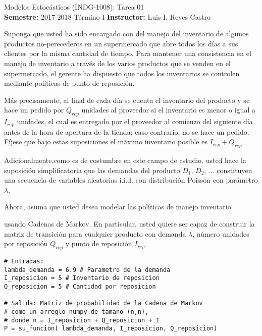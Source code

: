 \documentclass[ a4paper, twoside, 11pt]{article}
\newcommand{\numero}{01}
\begin{document}
\allowdisplaybreaks

\begin{center}
\Large Modelos Estoc\'asticos (INDG-1008): Tarea \numero \\[1ex]
\small \textbf{Semestre:} 2017-2018 T\'ermino I \qquad
\textbf{Instructor:} Luis I. Reyes Castro
\end{center}
\fullskip

%

\begin{problem}
Suponga que usted ha sido encargado con del manejo del inventario de algunos productos no-perecederos en un supermercado que abre todos los d\'ias a sus clientes por la misma cantidad de tiempo. Para mantener una consistencia en el manejo de inventario a trav\'es de los varios productos que se venden en el supermercado, el gerente ha dispuesto que todos los inventarios se controlen mediante pol\'iticas de punto de reposici\'on. 

M\'as precisamente, al final de cada d\'ia se cuenta el inventario del producto y se hace un pedido por $Q_{rep}$ unidades al proveedor si el inventario es menor o igual a $I_{rep}$ unidades, \linebreak el cual es entregado por el proveedor al comienzo del siguiente d\'ia antes de la hora de apertura de la tienda; caso contrario, no se hace un pedido. F\'ijese que bajo estas suposiciones el m\'aximo inventario posible es $I_{rep} + Q_{rep}$. 

Adicionalmente,como es de costumbre en este campo de estudio, usted hace la suposici\'on simplificatoria que las demandas del producto $D_1, \, D_2, \, \dots$ constituyen una secuencia de variables aleatorias i.i.d. con distribuci\'on Poisson con par\'ametro $\lambda$. 

Ahora, asuma que usted desea modelar las pol\'iticas de manejo inventario 


 usando Cadenas de Markov. En particular, usted quiere ser capaz de construir la matriz de transici\'on para cualquier producto con demanda $\lambda$, n\'umero unidades por reposici\'on $Q_{rep}$ y punto de reposici\'on $I_{rep}$. 


\fullskip
\begin{center}
\begin{minipage}{0.8\textwidth}
\begin{verbatim}
# Entradas:
lambda_demanda = 6.9 # Parametro de la demanda
I_reposicion = 5 # Inventario de reposicion
Q_reposicion = 5 # Cantidad por reposicion

# Salida: Matriz de probabilidad de la Cadena de Markov
# como un arreglo numpy de tamano (n,n),
# donde n = I_reposicion + Q_reposicion + 1
P = su_funcion( lambda_demanda, I_reposicion, Q_reposicion)
\end{verbatim}
\end{minipage}
\end{center}




\end{problem}
\vspace{\baselineskip}
\end{document}
